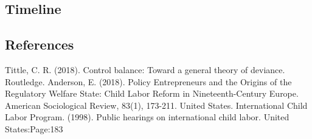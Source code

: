 \documentclass[11pt, a4paper, margin=1in]{IEEEtran}
\begin{document}
\subsection{Timeline}

\subsection{References}
\begin{thebibliography}{9}
    Tittle, C. R. (2018). Control balance: Toward a general theory of deviance. Routledge.
    Anderson, E. (2018). Policy Entrepreneurs and the Origins of the Regulatory Welfare State: Child Labor Reform in Nineteenth-Century Europe. American Sociological Review, 83(1), 173-211.
    United States. International Child Labor Program. (1998). Public hearings on international child labor. United States:Page:183
\end{thebibliography}
\end{document}
